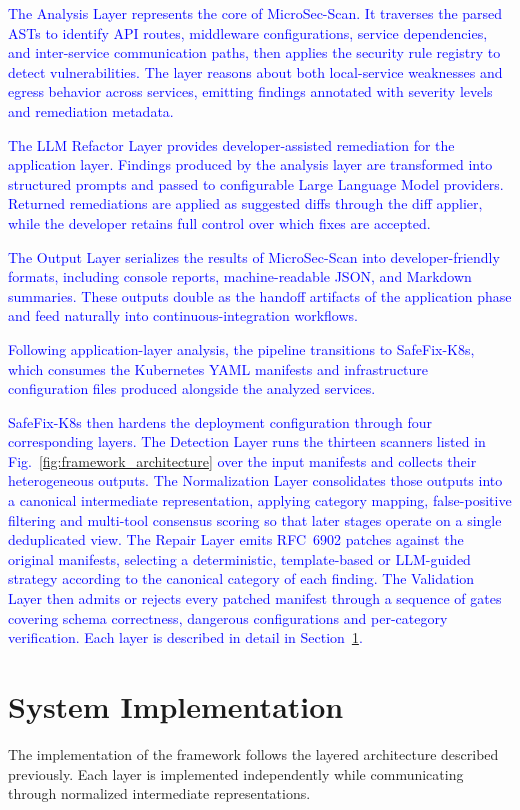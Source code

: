 \documentclass[preprint,12pt]{elsarticle}
\newcommand{\new}[1]{\textcolor{blue}{#1}}
\begin{document}
\new{The Analysis Layer represents the core of MicroSec-Scan. It traverses the
parsed ASTs to identify API routes, middleware configurations, service
dependencies, and inter-service communication paths, then applies the
security rule registry to detect vulnerabilities. The layer reasons about
both local-service weaknesses and egress behavior across services, emitting
findings annotated with severity levels and remediation metadata.}

\new{The LLM Refactor Layer provides developer-assisted remediation for the
application layer. Findings produced by the analysis layer are transformed
into structured prompts and passed to configurable Large Language Model
providers. Returned remediations are applied as suggested diffs through the
diff applier, while the developer retains full control over which fixes are
accepted.}

\new{The Output Layer serializes the results of MicroSec-Scan into
developer-friendly formats, including console reports, machine-readable JSON,
and Markdown summaries. These outputs double as the handoff artifacts of the
application phase and feed naturally into continuous-integration workflows.}

\new{Following application-layer analysis, the pipeline transitions to
SafeFix-K8s, which consumes the Kubernetes YAML manifests and infrastructure
configuration files produced alongside the analyzed services.}


\new{SafeFix-K8s then hardens the deployment configuration through four
corresponding layers. The Detection Layer runs the thirteen scanners listed in
Fig.~\ref{fig:framework_architecture} over the input manifests and collects
their heterogeneous outputs. The Normalization Layer consolidates those
outputs into a canonical intermediate representation, applying category
mapping, false-positive filtering and multi-tool consensus scoring so that
later stages operate on a single deduplicated view. The Repair Layer emits
RFC~6902 patches against the original manifests, selecting a deterministic,
template-based or LLM-guided strategy according to the canonical category of
each finding. The Validation Layer then admits or rejects every patched
manifest through a sequence of gates covering schema correctness, dangerous
configurations and per-category verification. Each layer is described in
detail in Section~\ref{sec:implementation}.}

\section{System Implementation}
\label{sec:implementation}
The implementation of the framework follows the layered architecture
described previously. Each layer is implemented independently while
communicating through normalized intermediate representations.
\end{document}

